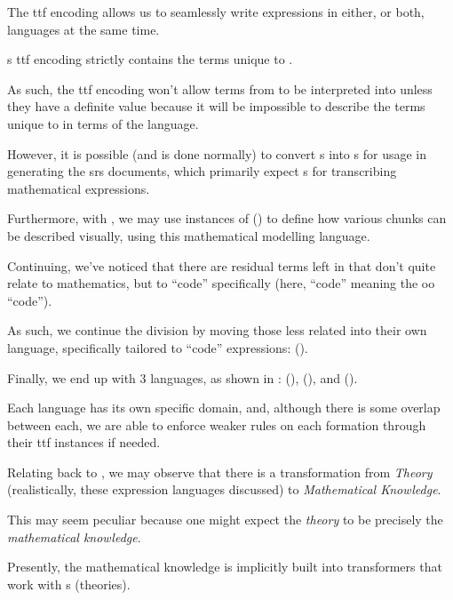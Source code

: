 The \acs{ttf} encoding allows us to seamlessly write expressions in either, or
both, languages at the same time. 

\ModelExpr{}s \acs{ttf} encoding strictly contains the terms unique to
\ModelExpr{}.

As such, the \acs{ttf} encoding won't allow terms from \ModelExpr{} to be
interpreted into \Expr{} unless they have a definite value because it will be
impossible to describe the terms unique to \ModelExpr{} in terms of the \Expr{}
language.

However, it is possible (and is done normally) to convert \Expr{}s into
\ModelExpr{}s for usage in generating the \acs{srs} documents, which primarily
expect \ModelExpr{}s for transcribing mathematical expressions.

Furthermore, with \ModelExpr{}, we may use instances of \Express{}
() to define how various chunks can be described
visually, using this mathematical modelling language.

\currentExpressHaskell{}

Continuing, we've noticed that there are residual terms left in \Expr{} that
don't quite relate to mathematics, but to ``code'' specifically (here, ``code''
meaning the \acs{oo} ``code'').

As such, we continue the division by moving those less related into their own
language, specifically tailored to ``code'' expressions: \CodeExpr{} ().




Finally, we end up with 3 languages, as shown in : \Expr{}
(), \ModelExpr{} (), and
\CodeExpr{} ().

Each language has its own specific domain, and, although there is some overlap
between each, we are able to enforce weaker rules on each formation through
their \acs{ttf} instances if needed.




Relating back to , we may observe that there is a
transformation from \textit{Theory} (realistically, these expression languages
discussed) to \textit{Mathematical Knowledge}.

This may seem peculiar because one might expect the \textit{theory} to be
precisely the \textit{mathematical knowledge}.

Presently, the mathematical knowledge is implicitly built into transformers that
work with \RelationConcept{}s (theories).

